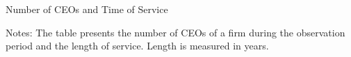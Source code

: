 \begin{table}[h]
    \centering
    \caption {Number of CEOs and Time of Service}
    \vspace{.2cm}
    \label{tab:CEO_desc}   
    
    
   \begin{minipage}{9.5cm}
   \vspace{.2cm}
               \footnotesize {Notes: The table presents the number of CEOs of a firm during the observation period and the length of service. Length is measured in years.}    
   \end{minipage}
\end{table}
